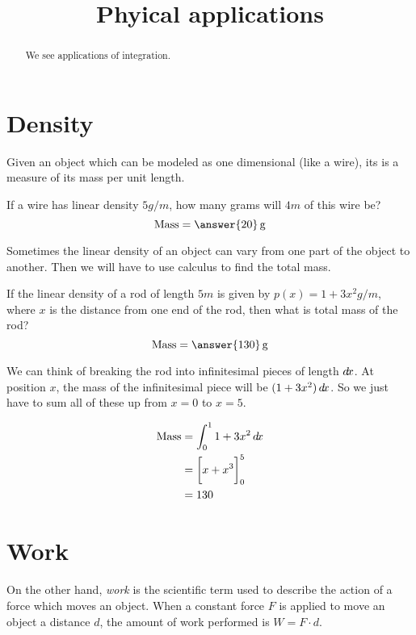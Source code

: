\documentclass{ximera}
\title[Dig-In:]{Phyical applications}
\begin{document}
\begin{abstract}
We see applications of integration.
\end{abstract}
\maketitle

\section{Density}

Given an object which can be modeled as one dimensional (like a wire),
its  is a measure of its mass per unit length.

\begin{question}
  If a wire has linear density $5 \unit{g}/\unit{m}$, how many grams
  will $4 \unit{m}$ of this wire be?
  \[
  \text{Mass} = \answer{20} \unit{g}
  \]
\end{question}

Sometimes the linear density of an object can vary from one part of
the object to another.  Then we will have to use calculus to find the
total mass.

\begin{question}
  If the linear density of a rod of length $5\unit{m}$ is given by
  $p(x) = 1+3x^2 \unit{g}/\unit{m}$, where $x$ is the distance from
  one end of the rod, then what is total mass of the rod?
  \[
  \textrm{Mass} = \answer{130} \unit{g}
  \]
  \begin{hint}
    We can think of breaking the rod into infinitesimal pieces of
    length $\mathop{}\!d\! x$.  At position $x$, the mass of the infinitesimal
    piece will be $(1+3x^2)\mathop{}\!d\! x$.  So we just have to sum all of these
    up from $x=0$ to $x=5$.
  \end{hint}
  \begin{hint}
    \begin{align*}
      \text{Mass} &= \int_0^1 1+3x^2 \mathop{}\!d\! x\\
      &=\bigg[ x+x^3 \bigg]_0^5\\
      &=130
    \end{align*}
  \end{hint}
\end{question}

\section{Work}

On the other hand, \textit{work} is the scientific term used to
describe the action of a force which moves an object. When a constant
force $F$ is applied to move an object a distance $d$, the amount of
work performed is $W=F\cdot d$.
\end{document}
